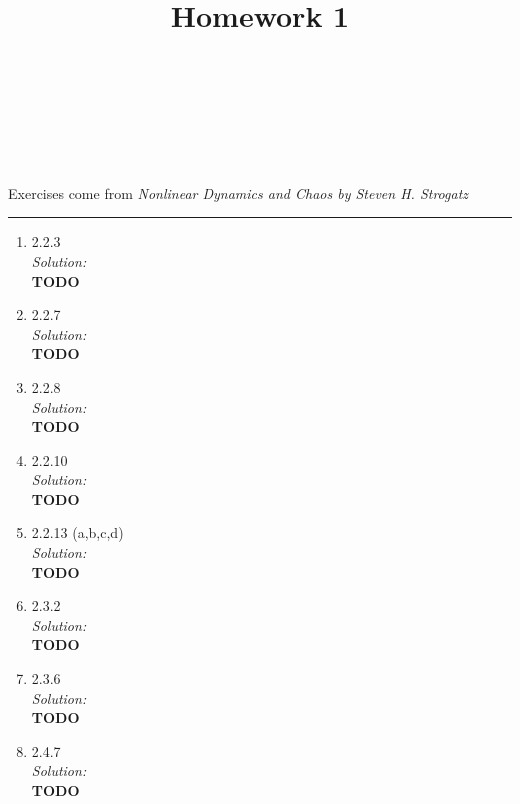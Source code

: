 \documentclass[10pt]{amsart}
\theoremstyle{nonumberplain}
\begin{document}
\pagestyle{empty}

\newcommand{\mline}{\vspace{.2in}\hrule\vspace{.2in}}

\noindent
{} \\
 \\
 \\
 \\

\title{\bf {Homework 1} }


\maketitle
\noindent
Exercises come from \textit{Nonlinear Dynamics and Chaos by Steven H. Strogatz}
\mline
\begin{enumerate}[label={\bf {\arabic*}:}]
\item 2.2.3 \\
\textit{Solution:} \\
\textbf{TODO} \\

\item 2.2.7 \\
\textit{Solution:} \\
\textbf{TODO} \\

\item 2.2.8 \\
\textit{Solution:} \\
\textbf{TODO} \\

\item 2.2.10 \\
\textit{Solution:} \\
\textbf{TODO} \\

\item 2.2.13 (a,b,c,d) \\
\textit{Solution:} \\
\textbf{TODO} \\

\item 2.3.2 \\
\textit{Solution:} \\
\textbf{TODO} \\

\item 2.3.6 \\
\textit{Solution:} \\
\textbf{TODO} \\

\item 2.4.7 \\
\textit{Solution:} \\
\textbf{TODO} \\

\end{enumerate}
\end{document}
